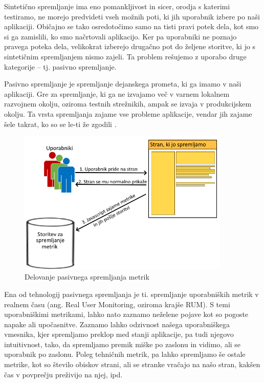 \documentclass[a4paper, 12pt]{book}
\begin{document}
Sintetično spremljanje ima eno pomankljivost in sicer, orodja s katerimi testiramo, ne morejo predvideti vseh možnih poti, ki jih uporabnik izbere po naši aplikaciji. Običajno se tako osredotočimo samo na tisti pravi potek dela, kot smo si ga zamislili, ko smo načrtovali aplikacijo. Ker pa uporabniki ne poznajo pravega poteka dela, velikokrat izberejo drugačno pot do željene storitve, ki jo s sintetičnim spremljanjem nismo zajeli. Ta problem rešujemo z uporabo druge kategorije – tj.  pasivno spremljanje.

Pasivno spremljanje je spremljanje dejanskega prometa, ki ga imamo v naši aplikaciji. Gre za spremljanje, ki ga ne izvajamo več v varnem lokalnem razvojnem okolju, oziroma testnih strežnikih, ampak se izvaja v produkcijskem okolju. Ta vrsta spremljanja zajame vse probleme aplikacije, vendar jih zajame šele takrat, ko so se le-ti že zgodili \cite{rum_o_reilly}.

\begin{figure}[h]
	\begin{center}
		\includegraphics[width=0.9\textwidth]{rum_diagram.png}
	\end{center}
	\caption{Delovanje pasivnega spremljanja metrik}
	\label{img:rum}
\end{figure}

Ena od tehnologij pasivnega spremljanja je ti. spremljanje uporabniških metrik v realnem času (ang. Real User Monitoring, oziroma krajše RUM). S temi uporabniškimi metrikami, lahko nato zaznamo neželene pojave kot so pogoste napake ali upočasnitve. Zaznamo lahko odzivnost našega uporabniškega vmesnika, kjer spremljamo preklop med stanji aplikacije, pa tudi njegovo intuitivnost, tako, da spremljamo premik miške po zaslonu in vidimo, ali se uporabnik  po zaslonu. Poleg tehničnih metrik, pa lahko spremljamo še ostale metrike, kot so število obiskov strani, ali se stranke vračajo na našo stran, kakšen čas v povprečju preživijo na njej, ipd.
\end{document}
